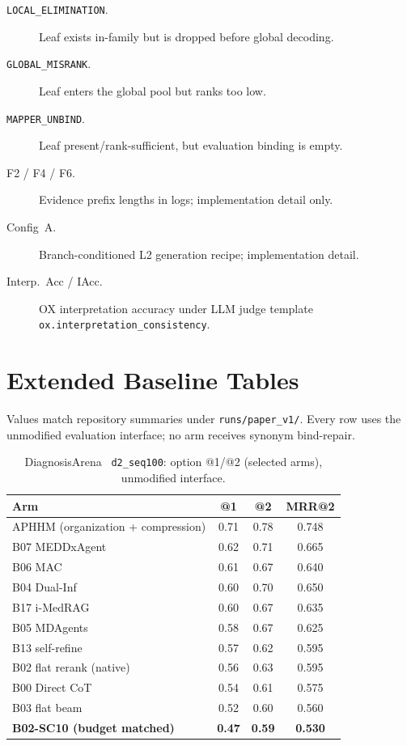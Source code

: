 \begin{description}
  \item[\texttt{LOCAL\_ELIMINATION}.] Leaf exists in-family but is dropped before global decoding.
  \item[\texttt{GLOBAL\_MISRANK}.] Leaf enters the global pool but ranks too low.
  \item[\texttt{MAPPER\_UNBIND}.] Leaf present/rank-sufficient, but evaluation binding is empty.
  \item[F2 / F4 / F6.] Evidence prefix lengths in logs; implementation detail only.
  \item[Config~A.] Branch-conditioned L2 generation recipe; implementation detail.
  \item[Interp.\ Acc / IAcc.] OX interpretation accuracy under LLM judge template \texttt{ox.interpretation\_consistency}.
\end{description}

\section{Extended Baseline Tables}
\label{app:tables}

Values match repository summaries under \texttt{runs/paper\_v1/}.
Every row uses the unmodified evaluation interface; no arm receives synonym bind-repair.

\begin{table}[t]
\centering
\scriptsize
\caption{DiagnosisArena~\cite{diagnosisarena} \texttt{d2\_seq100}: option @1/@2 (selected arms), unmodified interface.}
\label{tab:da-full}
\begin{tabular}{lccc}
\toprule
Arm & @1 & @2 & MRR@2 \\
\midrule
APHHM (organization + compression) & 0.71 & 0.78 & 0.748 \\
B07 MEDDxAgent~\cite{meddxagent2025} & 0.62 & 0.71 & 0.665 \\
B06 MAC~\cite{chen2025mac,mac2026} & 0.61 & 0.67 & 0.640 \\
B04 Dual-Inf~\cite{dualinf2025} & 0.60 & 0.70 & 0.650 \\
B17 i-MedRAG~\cite{imedrag} & 0.60 & 0.67 & 0.635 \\
B05 MDAgents~\cite{mdagents} & 0.58 & 0.67 & 0.625 \\
B13 self-refine~\cite{madaan2023selfrefine} & 0.57 & 0.62 & 0.595 \\
B02 flat rerank (native) & 0.56 & 0.63 & 0.595 \\
B00 Direct CoT & 0.54 & 0.61 & 0.575 \\
B03 flat beam & 0.52 & 0.60 & 0.560 \\
\textbf{B02-SC10 (budget matched)} & \textbf{0.47} & \textbf{0.59} & \textbf{0.530} \\
\bottomrule
\end{tabular}
\end{table}


